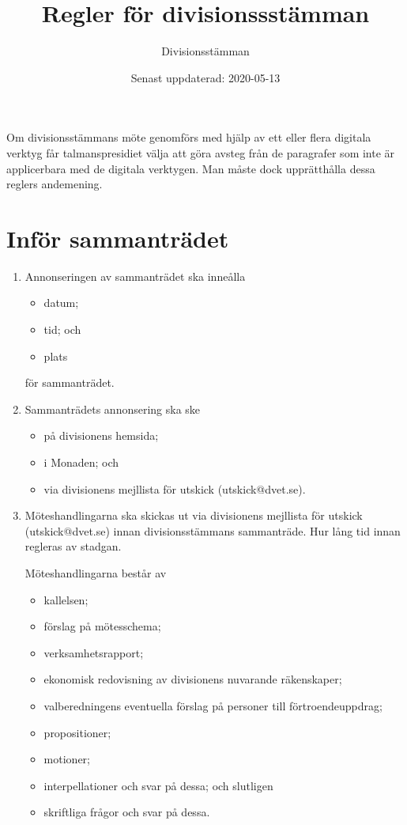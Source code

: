 \documentclass{dvd}
\begin{document}
	\title{Regler för divisionssstämman}
	\author{Divisionsstämman}
	\date{Senast uppdaterad: 2020-05-13}

	Om divisionsstämmans möte genomförs med hjälp av ett eller flera digitala verktyg får talmanspresidiet välja att göra avsteg från de paragrafer som inte är applicerbara med de digitala verktygen.
	Man måste dock upprätthålla dessa reglers andemening.

	\section{Inför sammanträdet}

	\begin{enumerate}[label=\arabic* §, ref=\arabic*]
		\item Annonseringen av sammanträdet ska inneålla

		\begin{itemize}
			\item datum;
			\item tid; och
			\item plats
		\end{itemize}

		för sammanträdet.

		\item Sammanträdets annonsering ska ske

		\begin{itemize}
			\item på divisionens hemsida;
			\item i Monaden; och
			\item via divisionens mejllista för utskick (utskick@dvet.se).
		\end{itemize}

		\item Möteshandlingarna ska skickas ut via divisionens mejllista för utskick (utskick@dvet.se) innan divisionsstämmans sammanträde.
		Hur lång tid innan regleras av stadgan.

		Möteshandlingarna består av

		\begin{itemize}
			\item kallelsen;
			\item förslag på mötesschema;
			\item verksamhetsrapport;
			\item ekonomisk redovisning av divisionens nuvarande räkenskaper;
			\item valberedningens eventuella förslag på personer till förtroendeuppdrag;
			\item propositioner;
			\item motioner;
			\item interpellationer och svar på dessa; och slutligen
			\item skriftliga frågor och svar på dessa.
		\end{itemize}


\end{enumerate}
\end{document}
